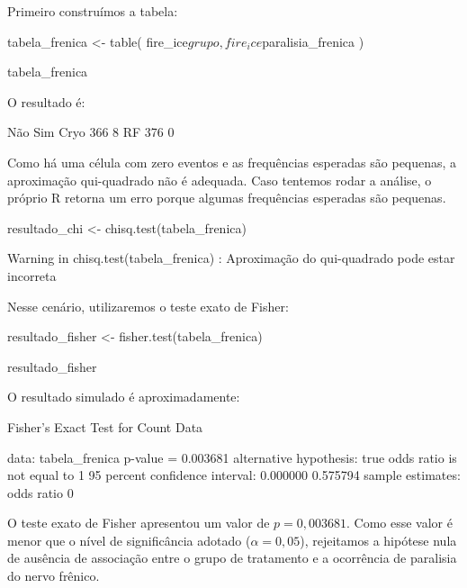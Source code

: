 Primeiro construímos a tabela:

\begin{code}
tabela_frenica <-
  table(
    fire_ice$grupo,
    fire_ice$paralisia_frenica
  )

tabela_frenica
\end{code}

O resultado é:

\begin{code}
      Não Sim
Cryo  366   8
RF    376   0
\end{code}

Como há uma célula com zero eventos e as frequências esperadas são pequenas,
a aproximação qui-quadrado não é adequada. Caso tentemos rodar a análise, o próprio R retorna um erro porque algumas frequências esperadas são pequenas.

\begin{code}
resultado_chi <-
  chisq.test(tabela_frenica)
\end{code}

\begin{code}
Warning in chisq.test(tabela_frenica) :
  Aproximação do qui-quadrado pode estar incorreta
\end{code}

Nesse cenário, utilizaremos o teste exato de Fisher:

\begin{code}
resultado_fisher <-
  fisher.test(tabela_frenica)

resultado_fisher
\end{code}

O resultado simulado é aproximadamente:

\begin{code}
	Fisher's Exact Test for Count Data

data:  tabela_frenica
p-value = 0.003681
alternative hypothesis: true odds ratio is not equal to 1
95 percent confidence interval:
 0.000000 0.575794
sample estimates:
odds ratio 
         0 
\end{code}

O teste exato de Fisher apresentou um valor de $p=0{,}003681$. Como esse
valor é menor que o nível de significância adotado ($\alpha=0{,}05$),
rejeitamos a hipótese nula de ausência de associação entre o grupo de
tratamento e a ocorrência de paralisia do nervo frênico.

